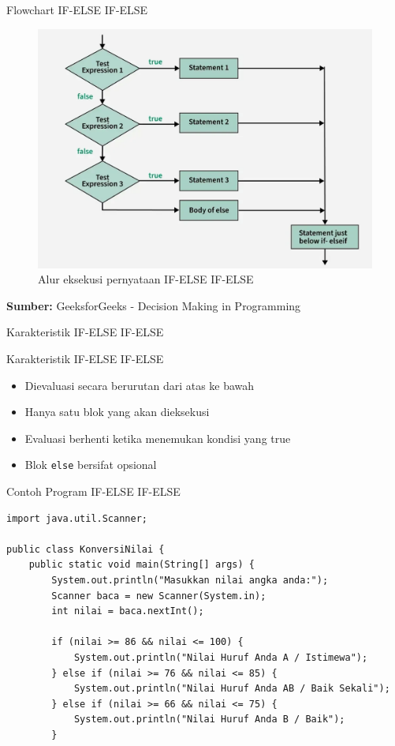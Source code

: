 \documentclass{beamer}
\begin{document}
\begin{frame}{Flowchart IF-ELSE IF-ELSE}
  \begin{figure}[h]
    \centering
    \includegraphics[width=0.7\linewidth]{Struktur Kontrol 1/if-elseif-else.png}
    \caption{Alur eksekusi pernyataan IF-ELSE IF-ELSE}
    \label{fig:if-else-if-flow}
  \end{figure}
  \textbf{Sumber:} GeeksforGeeks - Decision Making in Programming
\end{frame}

\begin{frame}{Karakteristik IF-ELSE IF-ELSE}
\begin{block}{Karakteristik IF-ELSE IF-ELSE}
    \begin{itemize}
      \item Dievaluasi secara berurutan dari atas ke bawah
      \item Hanya satu blok yang akan dieksekusi
      \item Evaluasi berhenti ketika menemukan kondisi yang true
      \item Blok \texttt{else} bersifat opsional
    \end{itemize}
  \end{block}
\end{frame}
\begin{frame}[fragile]{Contoh Program IF-ELSE IF-ELSE}
\begin{lstlisting}
import java.util.Scanner;

public class KonversiNilai {
    public static void main(String[] args) {
        System.out.println("Masukkan nilai angka anda:");
        Scanner baca = new Scanner(System.in);
        int nilai = baca.nextInt();
        
        if (nilai >= 86 && nilai <= 100) {
            System.out.println("Nilai Huruf Anda A / Istimewa");
        } else if (nilai >= 76 && nilai <= 85) {
            System.out.println("Nilai Huruf Anda AB / Baik Sekali");
        } else if (nilai >= 66 && nilai <= 75) {
            System.out.println("Nilai Huruf Anda B / Baik");
        }
\end{lstlisting}
\end{frame}
\end{document}

